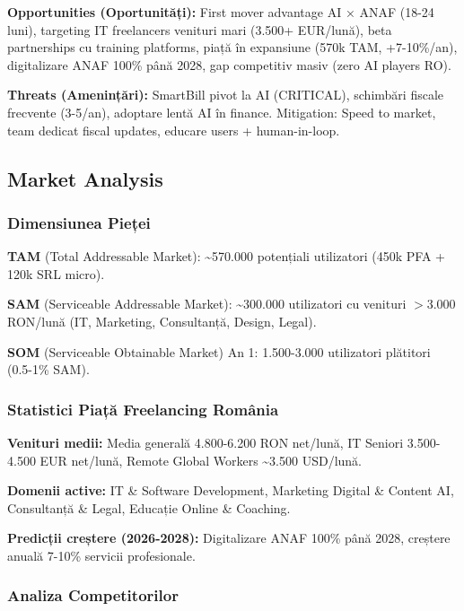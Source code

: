 \documentclass[11pt,a4paper]{article}
\begin{document}
\textbf{Opportunities (Oportunități):} First mover advantage AI × ANAF (18-24 luni), targeting IT freelancers venituri mari (3.500+ EUR/lună), beta partnerships cu training platforms, piață în expansiune (570k TAM, +7-10\%/an), digitalizare ANAF 100\% până 2028, gap competitiv masiv (zero AI players RO).

\textbf{Threats (Amenințări):} SmartBill pivot la AI (CRITICAL), schimbări fiscale frecvente (3-5/an), adoptare lentă AI în finance. Mitigation: Speed to market, team dedicat fiscal updates, educare users + human-in-loop.

\subsection{Market Analysis}

\subsubsection{Dimensiunea Pieței}

\textbf{TAM} (Total Addressable Market): \textasciitilde570.000 potențiali utilizatori (450k PFA + 120k SRL micro).

\textbf{SAM} (Serviceable Addressable Market): \textasciitilde300.000 utilizatori cu venituri $>$3.000 RON/lună (IT, Marketing, Consultanță, Design, Legal).

\textbf{SOM} (Serviceable Obtainable Market) An 1: 1.500-3.000 utilizatori plătitori (0.5-1\% SAM).

\subsubsection{Statistici Piață Freelancing România}

\textbf{Venituri medii:} Media generală 4.800-6.200 RON net/lună, IT Seniori 3.500-4.500 EUR net/lună, Remote Global Workers \textasciitilde3.500 USD/lună.

\textbf{Domenii active:} IT \& Software Development, Marketing Digital \& Content AI, Consultanță \& Legal, Educație Online \& Coaching.

\textbf{Predicții creștere (2026-2028):} Digitalizare ANAF 100\% până 2028, creștere anuală 7-10\% servicii profesionale.

\subsubsection{Analiza Competitorilor}
\end{document}
